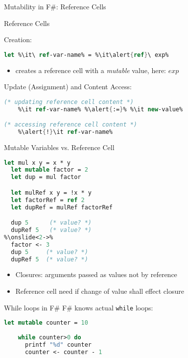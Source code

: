 \documentclass{beamer}
\newcommand{\Blue}[1]{\color{blue}#1\color{black}}
\begin{document}
\begin{frame}[fragile]{Mutability in F\#: Reference Cells}

\Blue{Reference Cells}

Creation:
\begin{lstlisting}[language=FSharp, escapechar=\%]
             let %\it\ ref-var-name% = %\it\alert{ref}\ exp% 
\end{lstlisting}

\begin{itemize}
  \item creates a reference cell with a \emph{mutable} value, here: $exp$
\end{itemize}

\pause 

Update (Assignment) and Content Access:
\begin{lstlisting}[language=FSharp, escapechar=\%]
(* updating reference cell content *)
    %\it ref-var-name% %\alert{:=}% %\it new-value%

(* accessing reference cell content *)
    %\alert{!}\it ref-var-name% 
\end{lstlisting}

\end{frame}

\begin{frame}[fragile]{Mutable Variables vs. Reference Cell}

\begin{lstlisting}[language=FSharp, escapechar=\%]
  let mul x y = x * y
  let mutable factor = 2
  let dup = mul factor

  let mulRef x y = !x * y
  let factorRef = ref 2
  let dupRef = mulRef factorRef

  dup 5      (* value? *)
  dupRef 5   (* value? *)
%\onslide<2->% 
  factor <- 3
  dup 5     (* value? *)
  dupRef 5  (* value? *)

\end{lstlisting}


\begin{itemize}
\item<3-> Closures: arguments passed as values not by reference
\item<4-> Reference cell need if change of value shall effect closure
\end{itemize}
\end{frame}

\begin{frame}[fragile]{While loops in F\#}
  F\# knows actual \lstinline!while! loops:

\begin{lstlisting}[language=FSharp]
    let mutable counter = 10 
     
    while counter>0 do
      printf "%d" counter
      counter <- counter - 1
\end{lstlisting}

\end{frame}
\end{document}
